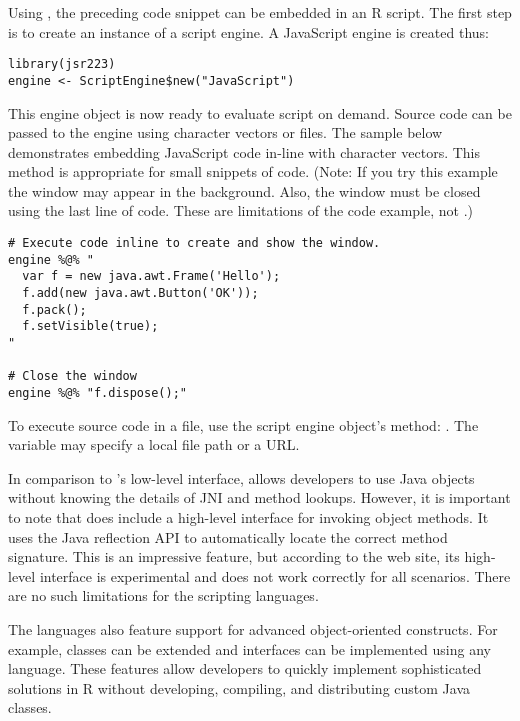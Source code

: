 Using , the preceding code snippet can be embedded in an R script. The first step is to create an instance of a script engine. A JavaScript engine is created thus:

\begin{verbatim}
library(jsr223)
engine <- ScriptEngine$new("JavaScript")
\end{verbatim}
This engine object is now ready to evaluate script on demand. Source code can be passed to the engine using character vectors or files. The sample below demonstrates embedding JavaScript code in-line with character vectors. This method is appropriate for small snippets of code. (Note: If you try this example the window may appear in the background. Also, the window must be closed using the last line of code. These are limitations of the code example, not .)

\begin{verbatim}
# Execute code inline to create and show the window.
engine %@% "
  var f = new java.awt.Frame('Hello');
  f.add(new java.awt.Button('OK'));
  f.pack();
  f.setVisible(true);
"

# Close the window
engine %@% "f.dispose();"
\end{verbatim}
To execute source code in a file, use the script engine object's  method: . The variable  may specify a local file path or a URL. %

In comparison to 's low-level interface,  allows developers to use Java objects without knowing the details of JNI and method lookups. However, it is important to note that  does include a high-level interface for invoking object methods. It uses the Java reflection API to automatically locate the correct method signature. This is an impressive feature, but according to the  web site, its high-level interface is experimental and does not work correctly for all scenarios. There are no such limitations for the  scripting languages.

The  languages also feature support for advanced object-oriented constructs. For example, classes can be extended and interfaces can be implemented using any language. These features allow developers to quickly implement sophisticated solutions in R without developing, compiling, and distributing custom Java classes.

